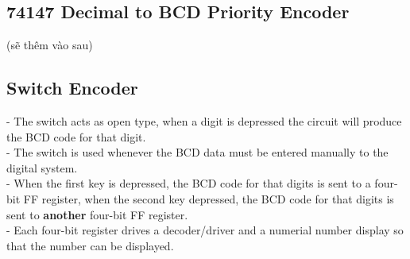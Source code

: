 \documentclass[12pt]{article}
\begin{document}
\subsection{74147 Decimal to BCD Priority Encoder}
(sẽ thêm vào sau)
\subsection{Switch Encoder}
- The switch acts as open type, when a digit is depressed the circuit will produce the BCD code for that digit. \\
- The switch is used whenever the BCD data must be entered manually to the digital system. \\
- When the first key is depressed, the BCD code for that digits is sent to a four-bit FF register, when the second key depressed, the BCD code for that digits is sent to \textbf{another} four-bit FF register. \\
- Each four-bit register drives a decoder/driver and a numerial number display so that the number can be displayed. \\
\end{document}
